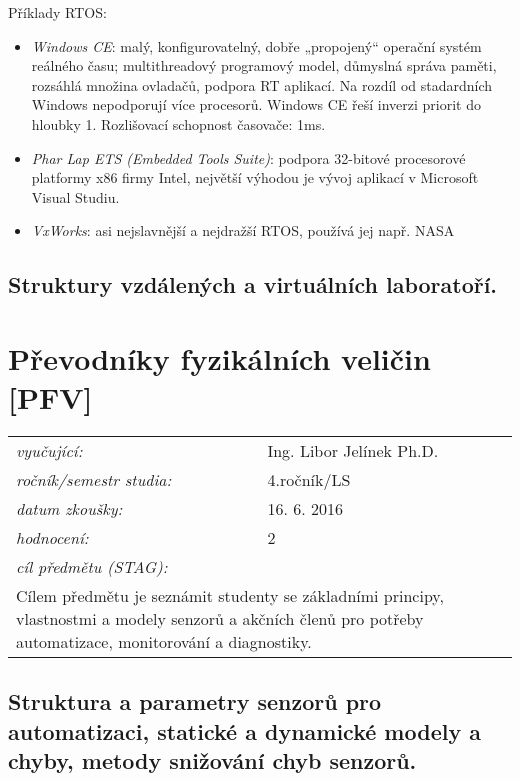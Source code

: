 Příklady RTOS:
\begin{itemize}
\item \textit{Windows CE}: malý, konfigurovatelný, dobře „propojený“ operační systém reálného času; multithreadový programový model, důmyslná správa paměti, rozsáhlá množina ovladačů, podpora RT aplikací. Na rozdíl od stadardních Windows nepodporují více procesorů. Windows CE řeší inverzi priorit do hloubky 1. Rozlišovací schopnost časovače: 1ms.
\item \textit{Phar Lap ETS (Embedded Tools Suite)}: podpora 32-bitové procesorové platformy x86 firmy Intel, největší výhodou je vývoj aplikací v Microsoft Visual Studiu.
\item \textit{VxWorks}: asi nejslavnější a nejdražší RTOS, používá jej např. NASA
\end{itemize}

\subsection{Struktury vzdálených a virtuálních laboratoří.}

\newpage
\section{Převodníky fyzikálních veličin [PFV]}

\begin{table}[H]
\centering
\begin{tabular}{p{4cm} p{12cm}}
\textit{vyučující:}             & Ing. Libor Jelínek Ph.D. \\
\textit{ročník/semestr studia:} & 4.ročník/LS \\
\textit{datum zkoušky:}         & 16. 6. 2016 \\
\textit{hodnocení:}             & 2 \\
\textit{cíl předmětu (STAG):}   & \\
\multicolumn{2}{p{16cm}}{Cílem předmětu je seznámit studenty se základními principy, vlastnostmi a modely senzorů a akčních členů pro potřeby automatizace, monitorování a diagnostiky.}
\end{tabular}
\end{table}

\subsection{Struktura a parametry senzorů pro automatizaci, statické a dynamické modely a chyby, metody snižování chyb senzorů.}

